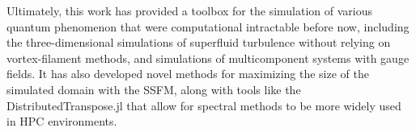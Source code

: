 Ultimately, this work has provided a toolbox for the simulation of various quantum phenomenon that were computational intractable before now, including the three-dimensional simulations of superfluid turbulence without relying on vortex-filament methods, and simulations of multicomponent systems with gauge fields.
It has also developed novel methods for maximizing the size of the simulated domain with the SSFM, along with tools like the DistributedTranspose.jl that allow for spectral methods to be more widely used in HPC environments.
